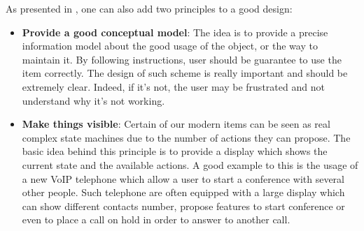 \documentclass[a4paper,11pt] {article}
\theoremstyle{definition}
\begin{document}
As presented in \cite{Norman02}, one can also add two principles to a good design:
\begin{itemize}
    \item \textbf{Provide a good conceptual model}: The idea is to provide a precise information model about the good usage of the object, or the way to maintain it. By following instructions, user should be guarantee to use the item correctly. The design of such scheme is really important and should be extremely clear. Indeed, if it's not, the user may be frustrated and not understand why it's not working.

    \item \textbf{Make things visible}: Certain of our modern items can be seen as real complex state machines due to the number of actions they can propose. The basic idea behind this principle is to provide a display which shows the current state and the available actions. A good example to this is the usage of a new VoIP telephone which allow a user to start a conference with several other people. Such telephone are often equipped with a large display which can show different contacts number, propose features to start conference or even to place a call on hold in order to answer to another call.
\end{itemize}
\end{document}
